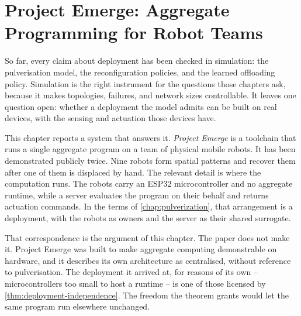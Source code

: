 \chapter{Project Emerge: Aggregate Programming for Robot Teams}
\label{chap:demonstrator}


So far, every claim about deployment has been checked in simulation:
the pulverisation model, the reconfiguration policies, and the learned offloading policy.
%
Simulation is the right instrument for the questions those chapters ask, because it makes topologies, failures, and network sizes controllable.
%
It leaves one question open: whether a deployment the model admits can be built on real devices, with the sensing and actuation those devices have.

This chapter reports a system that answers it.
%
\emph{Project Emerge} is a toolchain that runs a single aggregate program on a team of physical mobile robots.
It has been demonstrated publicly twice.
%
Nine robots form spatial patterns and recover them after one of them is displaced by hand.
%
The relevant detail is where the computation runs.
The robots carry an ESP32 microcontroller and no aggregate runtime,
while a server evaluates the program on their behalf and returns actuation commands.
%
In the terms of \cref{chap:pulverization}, that arrangement is a deployment, with the robots as owners and the server as their shared surrogate.

That correspondence is the argument of this chapter. The paper does not make it.
%
Project Emerge was built to make aggregate computing demonstrable on hardware, and it describes its own architecture as centralised, without reference to pulverisation.
%
The deployment it arrived at, for reasons of its own -- microcontrollers too small to host a runtime -- is one of those licensed by \cref{thm:deployment-independence}.
The freedom the theorem grants would let the same program run elsewhere unchanged.


